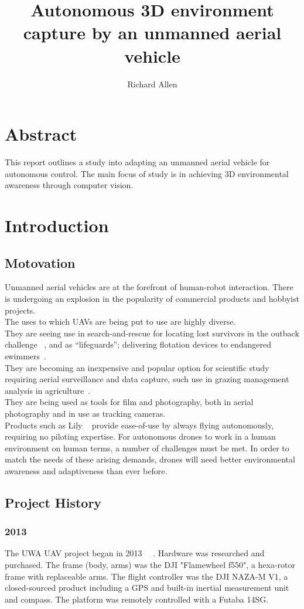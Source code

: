\documentclass[a4paper, 12pt, titlepage]{article}
\title{Autonomous 3D environment capture by an unmanned aerial vehicle}
\author{Richard Allen}
\begin{document}
\maketitle

\section{Abstract}
This report outlines a study into adapting an unmanned aerial vehicle for autonomous control. The main focus of study is in achieving 3D environmental awareness through computer vision. 

\section{Introduction}
	\subsection{Motovation}
Unmanned aerial vehicles are at the forefront of human-robot interaction. There is undergoing an explosion in the popularity of commercial products and hobbyist projects.
\\The uses to which UAVs are being put to use are highly diverse. 
\\They are seeing use in search-and-rescue for locating lost survivors in the outback challenge ~\cite{canberrauav-2012}, and as ``lifeguards''; delivering flotation devices to endangered swimmers~\cite{Motherboard}.
\\They are becoming an inexpensive and popular option for scientific study requiring aerial surveillance and data capture, such use in grazing management analysis in agriculture~\cite{UWAnews}.
\\They are being used as tools for film and photography, both in aerial photography and in use as tracking cameras. 
\\Products such as Lily ~\cite{Lily} provide ease-of-use by always flying autonomously, requiring no piloting expertise. For autonomous drones to work in a human environment on human terms, a number of challenges must be met. In order to match the needs of these arising demands, drones will need better environmental awareness and adaptiveness than ever before.


	\subsection{Project History}
		\subsubsection{2013}
The UWA UAV project began in 2013 ~\cite{Venables}~\cite{OConnor}. Hardware was researched and purchased. The frame (body, arms) was the DJI "Flamewheel f550", a hexa-rotor frame with replaceable arms. The flight controller was the DJI NAZA-M V1, a closed-sourced product including a GPS and built-in inertial measurement unit and compass. The platform was remotely controlled with a Futaba 14SG.
\end{document}
